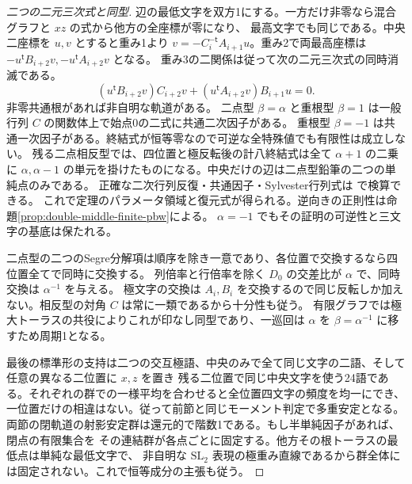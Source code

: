 \begin{proof}[二つの二元三次式と同型]
辺の最低文字を双方1にする。一方だけ非零なら混合グラフと $xz$ の式から他方の全座標が零になり、
最高文字でも同じである。中央二座標を $u,v$ とすると重み1より
$v=-C_i^{-\mathsf t}A_{i+1}u$。重み2で両最高座標は $-u^{\mathsf t}B_{i+2}v,-u^{\mathsf t}A_{i+2}v$ となる。
重み3の二関係は従って次の二元三次式の同時消滅である。
\[
 (u^{\mathsf t}B_{i+2}v)C_{i+2}v+(u^{\mathsf t}A_{i+2}v)B_{i+1}u=0.
\]
非零共通根があれば非自明な軌道がある。
二点型 $\beta=\alpha$ と重根型 $\beta=1$ は一般行列 $C$ の関数体上で始点0の二式に共通二次因子がある。
重根型 $\beta=-1$ は共通一次因子がある。終結式が恒等零なので可逆な全特殊値でも有限性は成立しない。
残る二点相反型では、四位置と極反転後の計八終結式は全て $\alpha+1$ の二乗に
$\alpha,\alpha-1$ の単元を掛けたものになる。中央だけの辺は二点型鉛筆の二つの単純点のみである。
正確な二次行列反復・共通因子・Sylvester行列式は  で検算できる。
これで定理のパラメータ領域と復元式が得られる。逆向きの正則性は命題\ref{prop:double-middle-finite-pbw}による。
$\alpha=-1$ でもその証明の可逆性と三文字の基底は保たれる。

二点型の二つのSegre分解項は順序を除き一意であり、各位置で交換するなら四位置全てで同時に交換する。
列倍率と行倍率を除く $D_0$ の交差比が $\alpha$ で、同時交換は $\alpha^{-1}$ を与える。
極文字の交換は $A_i,B_i$ を交換するので同じ反転しか加えない。相反型の対角 $C$ は常に一類であるから十分性も従う。
有限グラフでは極大トーラスの共役によりこれが印なし同型であり、一巡回は $\alpha$ を $\beta=\alpha^{-1}$ に移すため周期1となる。

最後の標準形の支持は二つの交互極語、中央のみで全て同じ文字の二語、そして任意の異なる二位置に $x,z$ を置き
残る二位置で同じ中央文字を使う24語である。それぞれの群での一様平均を合わせると全位置四文字の頻度を均一にでき、
一位置だけの相違はない。従って前節と同じモーメント判定で多重安定となる。
両節の閉軌道の射影安定群は還元的で階数1である。もし半単純因子があれば、閉点の有限集合を
その連結群が各点ごとに固定する。他方その根トーラスの最低点は単純な最低文字で、
非自明な $\mathrm{SL}_2$ 表現の極重み直線であるから群全体には固定されない。これで恒等成分の主張も従う。
\end{proof}
